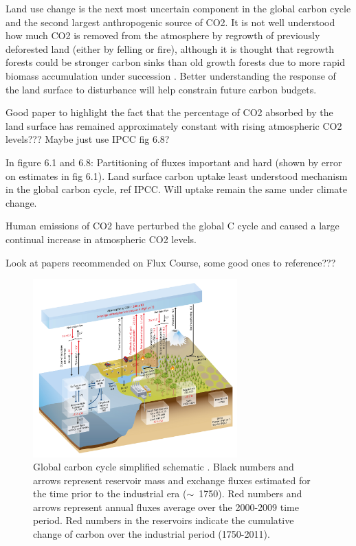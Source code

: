\documentclass[11pt]{article}
\begin{document}
Land use change is the next most uncertain component in the global carbon cycle and the second largest anthropogenic source of CO2. It is not well understood how much CO2 is removed from the atmosphere by regrowth of previously deforested land (either by felling or fire), although it is thought that regrowth forests could be stronger carbon sinks than old growth forests due to more rapid biomass accumulation under succession \citep{pan2011large}. Better understanding the response of the land surface to disturbance will help constrain future carbon budgets. 

Good paper to highlight the fact that the percentage of CO2 absorbed by the land surface has remained approximately constant with rising atmospheric CO2 levels??? Maybe just use IPCC fig 6.8?

In figure 6.1 and 6.8: Partitioning of fluxes important and hard (shown by error on estimates in fig 6.1). Land surface carbon uptake least understood mechanism in the global carbon cycle, ref IPCC. Will uptake remain the same under climate change.

Human emissions of CO2 have perturbed the global C cycle and caused a large continual increase in atmospheric CO2 levels.

Look at papers recommended on Flux Course, some good ones to reference???

\begin{figure}[ht]
    \centering
    \includegraphics[width=0.7\textwidth]{ipcc_fig6_1.jpg}
    \caption{Global carbon cycle simplified schematic \citep{ciais2014carbon}. Black numbers and arrows represent reservoir mass and exchange fluxes estimated for the time prior to the industrial era (\(\sim\)~1750). Red numbers and arrows represent annual fluxes average over the 2000-2009 time period. Red numbers in the reservoirs indicate the cumulative change of carbon over the industrial period (1750-2011).}
    \label{fig:ipcc_fig6.1}
\end{figure}
\end{document}
